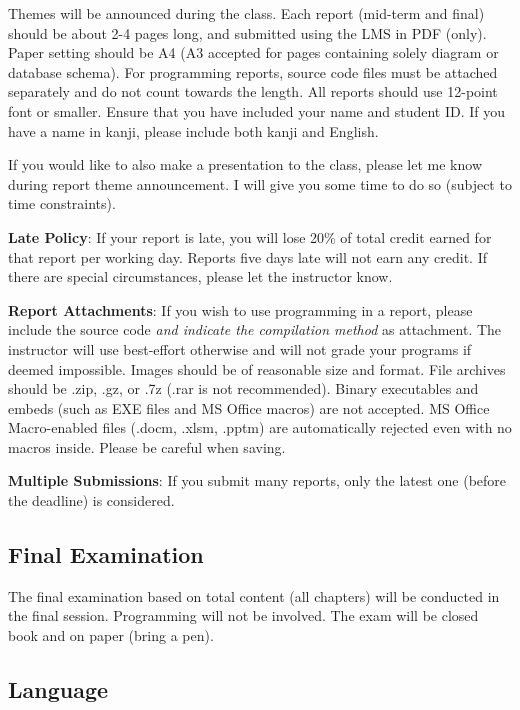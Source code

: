 \documentclass{article}
\begin{document}
Themes will be announced during the class. Each report (mid-term and final) should be about 2-4 pages long, and submitted using the LMS in PDF (only). Paper setting should be A4 (A3 accepted for pages containing solely diagram or database schema). For programming reports, source code files must be attached separately and do not count towards the length. All reports should use 12-point font or smaller. Ensure that you have included your name and student ID. If you have a name in kanji, please include both kanji and English.

If you would like to also make a presentation to the class, please let me know during report theme announcement. I will give you some time to do so (subject to time constraints).

\smallskip\noindent
\textbf{Late Policy}: If your report is late, you will lose 20\% of total credit earned for that report per working day. Reports five days late will not earn any credit. If there are special circumstances, please let the instructor know.

\smallskip\noindent
\textbf{Report Attachments}: If you wish to use programming in a report, please include the source code \textit{and indicate the compilation method} as attachment. The instructor will use best-effort otherwise and will not grade your programs if deemed impossible. Images should be of reasonable size and format. File archives should be .zip, .gz, or .7z (.rar is not recommended). Binary executables and embeds (such as EXE files and MS Office macros) are not accepted. MS Office Macro-enabled files (.docm, .xlsm, .pptm) are automatically rejected even with no macros inside. Please be careful when saving.

\smallskip\noindent
\textbf{Multiple Submissions}: If you submit many reports, only the latest one (before the deadline) is considered.

\subsection{Final Examination}

The final examination based on total content (all chapters) will be conducted in the final session. Programming will not be involved. The exam will be closed book and on paper (bring a pen).

\subsection{Language}
\end{document}
